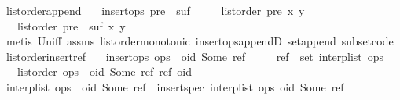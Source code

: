 \begin{isabellebody}
%
\isadelimproof
\isanewline
%
\endisadelimproof
\isanewline
{}\isamarkupfalse%
\ list{\isacharunderscore}order{\isacharunderscore}append{\isacharcolon}\isanewline
\ \ \ {\isachardoublequoteopen}insert{\isacharunderscore}ops\ {\isacharparenleft}pre\ {\isacharat}\ suf{\isacharparenright}{\isachardoublequoteclose}\isanewline
\ \ \ \ \ {\isachardoublequoteopen}list{\isacharunderscore}order\ pre\ x\ y{\isachardoublequoteclose}\isanewline
\ \ \ {\isachardoublequoteopen}list{\isacharunderscore}order\ {\isacharparenleft}pre\ {\isacharat}\ suf{\isacharparenright}\ x\ y{\isachardoublequoteclose}\isanewline
%
\isadelimproof
%
\endisadelimproof
%
\isatagproof
{}\isamarkupfalse%
\ {\isacharparenleft}metis\ Un{\isacharunderscore}iff\ assms\ list{\isacharunderscore}order{\isacharunderscore}monotonic\ insert{\isacharunderscore}ops{\isacharunderscore}appendD\ set{\isacharunderscore}append\ subset{\isacharunderscore}code{\isacharparenleft}{}{\isacharparenright}{\isacharparenright}%
\endisatagproof
{\isafoldproof}%
%
\isadelimproof
\isanewline
%
\endisadelimproof
\isanewline
{}\isamarkupfalse%
\ list{\isacharunderscore}order{\isacharunderscore}insert{\isacharunderscore}ref{\isacharcolon}\isanewline
\ \ \ {\isachardoublequoteopen}insert{\isacharunderscore}ops\ {\isacharparenleft}ops\ {\isacharat}\ {\isacharbrackleft}{\isacharparenleft}oid{\isacharcomma}\ Some\ ref{\isacharparenright}{\isacharbrackright}{\isacharparenright}{\isachardoublequoteclose}\isanewline
\ \ \ \ \ {\isachardoublequoteopen}ref\ {\isasymin}\ set\ {\isacharparenleft}interp{\isacharunderscore}list\ ops{\isacharparenright}{\isachardoublequoteclose}\isanewline
\ \ \ {\isachardoublequoteopen}list{\isacharunderscore}order\ {\isacharparenleft}ops\ {\isacharat}\ {\isacharbrackleft}{\isacharparenleft}oid{\isacharcomma}\ Some\ ref{\isacharparenright}{\isacharbrackright}{\isacharparenright}\ ref\ oid{\isachardoublequoteclose}\isanewline
%
\isadelimproof
%
\endisadelimproof
%
\isatagproof
{}\isamarkupfalse%
\ {\isacharminus}\isanewline
\ \ \isamarkupfalse%
\ {\isachardoublequoteopen}interp{\isacharunderscore}list\ {\isacharparenleft}ops\ {\isacharat}\ {\isacharbrackleft}{\isacharparenleft}oid{\isacharcomma}\ Some\ ref{\isacharparenright}{\isacharbrackright}{\isacharparenright}\ {\isacharequal}\ insert{\isacharunderscore}spec\ {\isacharparenleft}interp{\isacharunderscore}list\ ops{\isacharparenright}\ {\isacharparenleft}oid{\isacharcomma}\ Some\ ref{\isacharparenright}{\isachardoublequoteclose}\isanewline

\end{isabellebody}
